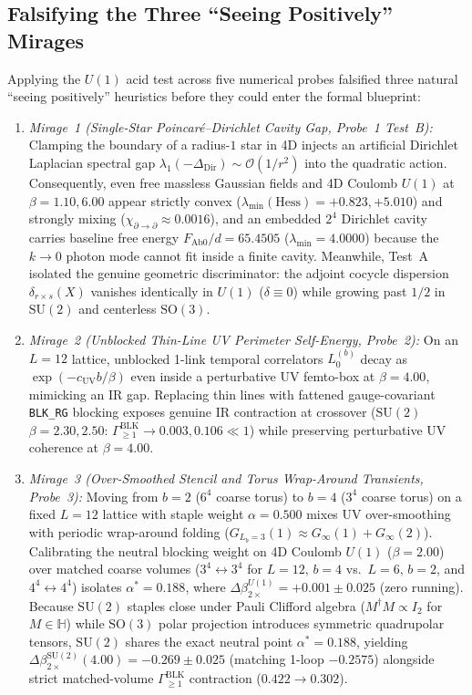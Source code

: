 \documentclass[11pt,a4paper]{article}
\newcommand{\SU}{\mathrm{SU}}
\begin{document}
\subsection{Falsifying the Three ``Seeing Positively'' Mirages}
Applying the $U(1)$ acid test across five numerical probes falsified three natural ``seeing positively'' heuristics before they could enter the formal blueprint:
\begin{enumerate}
\item \emph{Mirage~1 (Single-Star Poincar\'e--Dirichlet Cavity Gap, Probe~1 Test~B):} Clamping the boundary of a radius-$1$ star in 4D injects an artificial Dirichlet Laplacian spectral gap $\lambda_1(-\Delta_{\mathrm{Dir}}) \sim \mathcal{O}(1/r^2)$ into the quadratic action. Consequently, even free massless Gaussian fields and 4D Coulomb $U(1)$ at $\beta = 1.10, 6.00$ appear strictly convex ($\lambda_{\min}(\mathrm{Hess}) = +0.823, +5.010$) and strongly mixing ($\chi_{\partial\to\partial} \approx 0.0016$), and an embedded $2^4$ Dirichlet cavity carries baseline free energy $F_{\mathrm{Ab}0}/d = 65.4505$ ($\lambda_{\min} = 4.0000$) because the $k \to 0$ photon mode cannot fit inside a finite cavity. Meanwhile, Test~A isolated the genuine geometric discriminator: the adjoint cocycle dispersion $\delta_{r\times s}(X)$ vanishes identically in $U(1)$ ($\delta \equiv 0$) while growing past $1/2$ in $\SU(2)$ and centerless $\mathrm{SO}(3)$.
\item \emph{Mirage~2 (Unblocked Thin-Line UV Perimeter Self-Energy, Probe~2):} On an $L = 12$ lattice, unblocked 1-link temporal correlators $L_0^{(b)}$ decay as $\exp(-c_{\mathrm{UV}} b/\beta)$ even inside a perturbative UV femto-box at $\beta = 4.00$, mimicking an IR gap. Replacing thin lines with fattened gauge-covariant \texttt{BLK\_RG} blocking exposes genuine IR contraction at crossover ($\SU(2)$ $\beta = 2.30, 2.50$: $\Gamma_{\ge 1}^{\mathrm{BLK}} \to 0.003, 0.106 \ll 1$) while preserving perturbative UV coherence at $\beta = 4.00$.
\item \emph{Mirage~3 (Over-Smoothed Stencil and Torus Wrap-Around Transients, Probe~3):} Moving from $b=2$ ($6^4$ coarse torus) to $b=4$ ($3^4$ coarse torus) on a fixed $L=12$ lattice with staple weight $\alpha = 0.500$ mixes UV over-smoothing with periodic wrap-around folding ($G_{L_b=3}(1) \approx G_\infty(1) + G_\infty(2)$). Calibrating the neutral blocking weight on 4D Coulomb $U(1)$ ($\beta = 2.00$) over matched coarse volumes ($3^4 \leftrightarrow 3^4$ for $L=12,\,b=4$ vs.\ $L=6,\,b=2$, and $4^4 \leftrightarrow 4^4$) isolates $\alpha^* = 0.188$, where $\Delta\beta_{2\times}^{U(1)} = +0.001 \pm 0.025$ (zero running). Because $\SU(2)$ staples close under Pauli Clifford algebra ($M^\dagger M \propto I_2$ for $M \in \mathbb{H}$) while $\mathrm{SO}(3)$ polar projection introduces symmetric quadrupolar tensors, $\SU(2)$ shares the exact neutral point $\alpha^* = 0.188$, yielding $\Delta\beta_{2\times}^{\SU(2)}(4.00) = -0.269 \pm 0.025$ (matching 1-loop $-0.2575$) alongside strict matched-volume $\Gamma_{\ge 1}^{\mathrm{BLK}}$ contraction ($0.422 \to 0.302$).
\end{enumerate}
\end{document}
